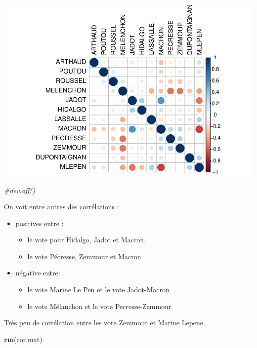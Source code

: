 \documentclass[
]{book}
\newenvironment{Shaded}{\begin{snugshade}}{\end{snugshade}}
\newcommand{\CommentTok}[1]{\textcolor[rgb]{0.56,0.35,0.01}{\textit{#1}}}
\newcommand{\FunctionTok}[1]{\textcolor[rgb]{0.13,0.29,0.53}{\textbf{#1}}}
\newcommand{\NormalTok}[1]{#1}
\begin{document}
\includegraphics{manuel_geo_quanti_files/figure-latex/unnamed-chunk-55-1.pdf}

\begin{Shaded}
\begin{Highlighting}[]
\CommentTok{\#dev.off()}
\end{Highlighting}
\end{Shaded}

On voit entre autres des corrélations :

\begin{itemize}
\item
  positives entre :

  \begin{itemize}
  \item
    le vote pour Hidalgo, Jadot et Macron,
  \item
    le vote Pécresse, Zemmour et Macron
  \end{itemize}
\item
  négative entre:

  \begin{itemize}
  \item
    le vote Marine Le Pen et le vote Jadot-Macron
  \item
    le vote Mélanchon et le vote Pecresse-Zemmour
  \end{itemize}
\end{itemize}

Très peu de corrélation entre les vote Zemmour et Marine Lepene.

\begin{Shaded}
\begin{Highlighting}[]
\FunctionTok{rm}\NormalTok{(cor.mat)}
\end{Highlighting}
\end{Shaded}
\end{document}
